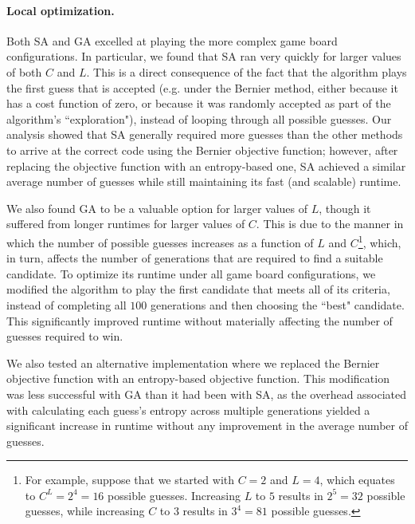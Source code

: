 \documentclass[11pt]{article}
\begin{document}
\paragraph{Local optimization.} Both SA and GA excelled at playing the more complex game board configurations.  In particular, we found that SA ran very quickly for larger values of both $C$ and $L$. This is a direct consequence of the fact that the algorithm plays the first guess that is accepted (e.g. under the Bernier method, either because it has a cost function of zero, or because it was randomly accepted as part of the algorithm's ``exploration"), instead of looping through all possible guesses. Our analysis showed that SA generally required more guesses than the other methods to arrive at the correct code using the Bernier objective function; however, after replacing the objective function with an entropy-based one, SA achieved a similar average number of guesses while still maintaining its fast (and scalable) runtime.

\newpage

We also found GA to be a valuable option for larger values of $L$, though it suffered from longer runtimes for larger values of $C$. This is due to the manner in which the number of possible guesses increases as a function of $L$ and $C$\footnote{For example, suppose that we started with $C=2$ and $L=4$, which equates to $C^L=2^4=16$ possible guesses. Increasing $L$ to $5$ results in $2^5=32$ possible guesses, while increasing $C$ to $3$ results in $3^4=81$ possible guesses.}, which, in turn, affects the number of generations that are required to find a suitable candidate. To optimize its runtime under all game board configurations, we modified the algorithm to play the first candidate that meets all of its criteria, instead of completing all $100$ generations and then choosing the ``best" candidate. This significantly improved runtime without materially affecting the number of guesses required to win.

We also tested an alternative implementation where we replaced the Bernier objective function with an entropy-based objective function. This modification was less successful with GA than it had been with SA, as the overhead associated with calculating each guess's entropy across multiple generations yielded a significant increase in runtime without any improvement in the average number of guesses.
\end{document}
